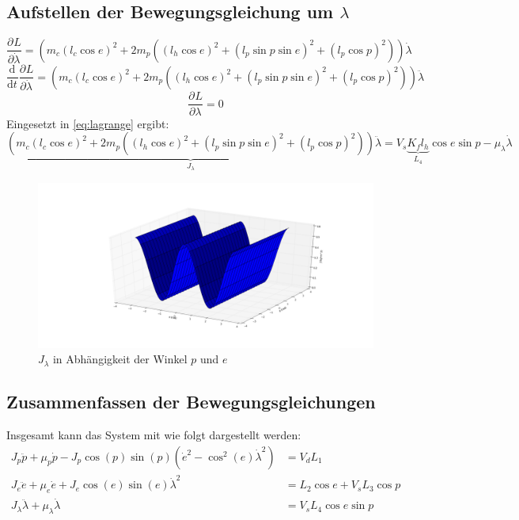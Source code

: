 \documentclass{article}
\newcommand{\partiell}[3][]{\frac{\partial^{#1}#2}{\partial{#3}^{#1}}}
\newcommand{\diff}[3][]{\frac{\mathrm{d}^{#1}#2}{\mathrm{d}{#3}^{#1}}}
\begin{document}
	\subsection{Aufstellen der Bewegungsgleichung um $\lambda$}
	\begin{equation}
	\partiell{L}{\dot{\lambda}} = (m_c (l_c \cos e)^2
	+ 2 m_p((l_h \cos e)^2 + (l_p \sin p \sin e)^2+(l_p \cos p)^2))\dot{\lambda}
	\end{equation}
	\begin{equation}
	\diff{}{t}\partiell{L}{\dot{\lambda}} = (m_c (l_c \cos e)^2
	+ 2 m_p((l_h \cos e)^2 + (l_p \sin p \sin e)^2+(l_p \cos p)^2))\ddot{\lambda}
	\end{equation}
	\begin{equation}
	\partiell{L}{\lambda} = 0
	\end{equation}
	Eingesetzt in \eqref{eq:lagrange} ergibt:
	\begin{equation}
	\underbrace{(m_c (l_c \cos e)^2
	+ 2 m_p((l_h \cos e)^2 + (l_p \sin p \sin e)^2+(l_p \cos p)^2))}_{J_\lambda}\ddot{\lambda} =  V_s \underbrace{K_f l_h}_{L_4} \cos e \sin p - \mu_\lambda \dot{\lambda}
	\end{equation}
	\begin{figure}[ht]
		\centering
		\includegraphics[width=1\textwidth]{images/J_l}
		\caption{$J_\lambda$ in Abhängigkeit der Winkel $p$ und $e$}
		\label{fig:J_l}
	\end{figure}	
	\subsection{Zusammenfassen der Bewegungsgleichungen}
	Insgesamt kann das System mit wie folgt dargestellt werden:
	\begin{align}
	J_p \ddot{p} + \mu_p \dot{p} - J_p \cos (p) \sin (p) (\dot{e}^2- \cos^2 (e) \dot{\lambda}^2) &= V_d L_1\\
	J_e\ddot{e} + \mu_e \dot{e} + J_e \cos (e) \sin (e) \dot{\lambda}^2 
	&= L_2 \cos e + V_s L_3 \cos p\\
	J_\lambda \ddot{\lambda} + \mu_\lambda \dot{\lambda} &= V_s L_4 \cos e \sin p
	\end{align}
\end{document}
